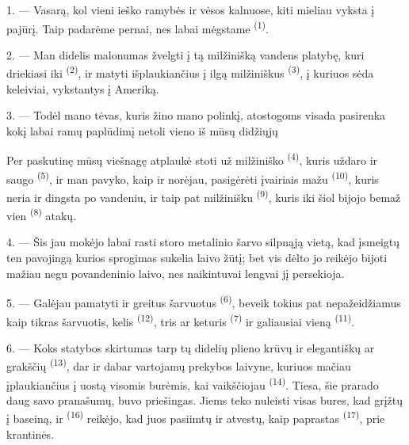 1. --- Vasarą, kol vieni ieško ramybės ir vėsos kalnuose, kiti mieliau vyksta į
pajūrį. Taip padarėme pernai, nes labai mėgstame 
\textsuperscript{(1)}.

2. --- Man didelis malonumas žvelgti į tą milžinišką vandens platybę, kuri driekiasi
iki  \textsuperscript{(2)}, ir matyti išplaukiančius į ilgą
 milžiniškus  \textsuperscript{(3)}, į kuriuos
sėda keleiviai, vykstantys į Ameriką.

3. --- Todėl mano tėvas, kuris žino mano polinkį, atostogoms visada pasirenka kokį
labai ramų paplūdimį netoli vieno iš mūsų didžiųjų 

Per paskutinę mūsų viešnagę  atplaukė stoti už milžiniško
 \textsuperscript{(4)}, kuris uždaro ir saugo 
\textsuperscript{(5)}, ir man pavyko, kaip ir norėjau, pasigėrėti įvairiais
 mažu  \textsuperscript{(10)},
kuris neria ir dingsta po vandeniu, ir taip pat milžinišku 
\textsuperscript{(9)}, kuris iki šiol bijojo bemaž vien 
\textsuperscript{(8)} atakų.

\VUsaut{3.0mm}
\VUsaut{3.0mm}

4. --- Šis jau mokėjo labai  rasti storo metalinio šarvo silpnąją
vietą, kad įsmeigtų ten pavojingą  kurios sprogimas sukelia laivo
žūtį; bet vis dėlto jo reikėjo bijoti mažiau negu povandeninio laivo, nes naikintuvai
lengvai jį persekioja.

5. --- Galėjau pamatyti ir greitus šarvuotus 
\textsuperscript{(6)}, beveik tokius pat nepažeidžiamus kaip tikras šarvuotis, kelis
 \textsuperscript{(12)}, tris ar keturis  \textsuperscript{(7)} ir galiausiai vieną 
\textsuperscript{(11)}. 

6. --- Koks statybos skirtumas tarp tų didelių plieno krūvų ir elegantiškų
 ar grakščių  \textsuperscript{(13)}, dar ir
dabar vartojamų prekybos laivyne, kuriuos mačiau įplaukiančius į uostą visomis burėmis,
kai vaikščiojau  \textsuperscript{(14)}. Tiesa, šie prarado daug
savo pranašumų,   buvo priešingas. Jiems teko nuleisti
visas bures, kad grįžtų į baseiną, ir  \textsuperscript{(16)} reikėjo,
kad juos pasiimtų ir atvestų, kaip paprastas  \textsuperscript{(17)},
prie krantinės.

